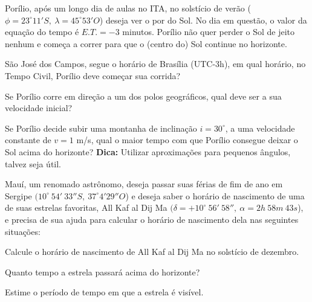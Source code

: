 \documentclass[11pt]{article}
\begin{document}
    
    \begin{pproblem}
        Porílio, após um longo dia de aulas no ITA, no solstício de verão (\(\phi = 23^\circ 11' S, \ \lambda = 45^\circ 53' O\)) deseja ver o por do Sol. No dia em questão, o valor da equação do tempo é \(E.T. = -3\) minutos. Porílio não quer perder o Sol de jeito nenhum e começa a correr para que o (centro do) Sol continue no horizonte.
    
        \begin{alternativas}
            \item São José dos Campos, segue o horário de Brasília (UTC-3h), em qual horário, no Tempo Civil, Porílio deve começar sua corrida?
            \item Se Porílio corre em direção a um dos polos geográficos, qual deve ser a sua velocidade inicial?
            \item Se Porílio decide subir uma montanha de inclinação \(i = 30^\circ\), a uma velocidade constante de \(v = 1\) m/s, qual o maior tempo com que Porílio consegue deixar o Sol acima do horizonte?
            \textbf{Dica: } Utilizar aproximações para pequenos ângulos, talvez seja útil.
        \end{alternativas}
\end{pproblem}

\begin{pproblem}
    Mauí, um renomado astrônomo, deseja passar suas férias de fim de ano em Sergipe \((10^\circ \ 54'\ 33'' S, \ 37^\circ 4'29'' O\)) e deseja saber o horário de nascimento de uma de suas estrelas favoritas, All Kaf al Dij Ma  \((\delta = +10^\circ \ 56'\ 58'', \ \alpha = 2h \ 58m \ 43s\)), e precisa de sua ajuda para calcular o horário de nascimento dela nas seguintes situações:
    
    \begin{alternativas}
        \item Calcule o horário de nascimento de All Kaf al Dij Ma  no solstício de dezembro.
        \item Quanto tempo a estrela passará acima do horizonte?
        \item Estime o período de tempo em que a estrela é visível.
    \end{alternativas}

    \end{pproblem}
\end{document}
